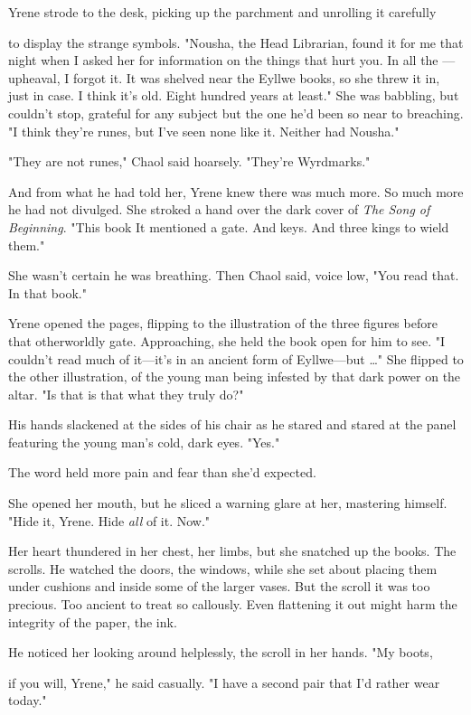 Yrene strode to the desk, picking up the parchment and unrolling it carefully

to display the strange symbols. "Nousha, the Head Librarian, found it for me that night when I asked her for information on  the things that hurt you. In all the ---upheaval, I forgot it. It was shelved near the Eyllwe books, so she threw it in, just in case. I think it's old. Eight hundred years at least." She was babbling, but couldn't stop, grateful for any subject but the one he'd been so near to breaching. "I think they're runes, but I've seen none like it. Neither had Nousha."

"They are not runes," Chaol said hoarsely. "They're Wyrdmarks."

And from what he had told her, Yrene knew there was much more. So much more he had not divulged. She stroked a hand over the dark cover of
\emph{The Song of Beginning}. "This book  It mentioned a gate. And keys. And three kings to wield them."

She wasn't certain he was breathing. Then Chaol said, voice low, "You read that. In that book."

Yrene opened the pages, flipping to the illustration of the three figures before that otherworldly gate. Approaching, she held the book open for him to see. "I couldn't read much of it---it's in an ancient form of Eyllwe---but \ldots" She flipped to the other illustration, of the young man being infested by that dark power on the altar. "Is that
 is that what they truly do?"

His hands slackened at the sides of his chair as he stared and stared at the panel featuring the young man's cold, dark eyes. "Yes."

The word held more pain and fear than she'd expected.

She opened her mouth, but he sliced a warning glare at her, mastering himself. "Hide it, Yrene. Hide \emph{all} of it. Now."

Her heart thundered in her chest, her limbs, but she snatched up the books. The scrolls. He watched the doors, the windows, while she set about placing them under cushions and inside some of the larger vases. But the scroll  it was too precious. Too ancient to treat so callously. Even flattening it out might harm the integrity of the paper, the ink.

He noticed her looking around helplessly, the scroll in her hands. "My boots,

if you will, Yrene," he said casually. "I have a second pair that I'd rather wear today."

